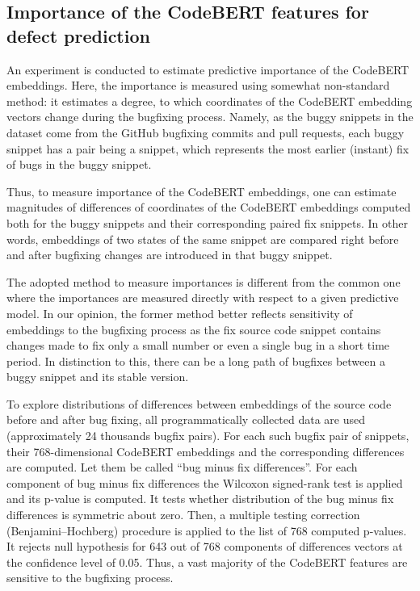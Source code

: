 \documentclass[10pt,conference]{IEEEtran}
\begin{document}
\subsection{Importance of the CodeBERT features for defect prediction}

An experiment is conducted to estimate predictive importance of the CodeBERT embeddings.
Here, the importance is measured using somewhat non-standard method:
it estimates a degree, to which coordinates of the CodeBERT embedding vectors change during the bugfixing process.
Namely, as the buggy snippets in the dataset come from the GitHub bugfixing commits and pull requests, 
each buggy snippet has a pair being a snippet, which represents the most earlier (instant) fix of bugs
in the buggy snippet. 

Thus, to measure importance of the CodeBERT embeddings, one can estimate magnitudes
of differences of coordinates of the CodeBERT embeddings computed both for the buggy snippets and their corresponding paired fix snippets.
In other words, embeddings of two states of the same snippet are compared
right before and after bugfixing changes are introduced in that buggy snippet. 

The adopted method to measure importances is different
from the common one where the importances are measured directly with respect to a given predictive model. 
In our opinion, the former method better reflects sensitivity of embeddings to the bugfixing process as
the fix source code snippet contains changes made to fix only a small number or even a single bug in a short time period. 
In distinction to this,
there can be a long path of bugfixes between a buggy snippet and its stable version. 

To explore distributions of differences between embeddings of the source code before and after bug fixing, all programmatically collected data are used (approximately 24 thousands bugfix pairs).
For each such bugfix pair of snippets, their 768-dimensional CodeBERT embeddings and the corresponding differences are computed. Let them be called ``bug minus fix differences''.
For each component of bug minus fix differences the Wilcoxon signed-rank test is applied and its p-value is computed. 
It tests whether distribution of the bug minus fix differences is symmetric about zero. Then, 
a multiple testing correction (Benjamini--Hochberg) procedure is applied to the list of 768 computed p-values. 
It rejects null hypothesis for 643 out of 768 components of differences vectors at the confidence level of 0.05.
Thus, a vast majority of the CodeBERT features are sensitive to the bugfixing process.
\end{document}
